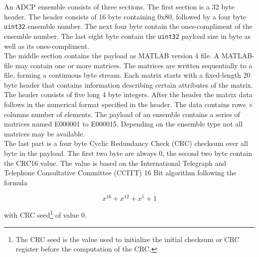 An ADCP ensemble consists of three sections. The first section is a 32 byte header. The header consists of 16 byte containing 0x80, followed by a four byte \texttt{uint32} ensemble number. The next four byte contain the ones-compliment of the ensemble number. The last eight byte contain the \texttt{uint32} payload size in byte as well as its ones-compliment.\\
The middle section contains the payload as MATLAB version 4 file. A MATLAB-file may contain one or more matrices. The matrices are written sequentially to a file,  forming a continuous byte stream. Each matrix starts with a fixed-length 20 byte header that contains information describing certain attributes of the matrix. The header consists of five long 4 byte integers. After the header the matrix data follows in the numerical format specified in the header. The data contains rows $\times$ columns number of elements.
The payload of an ensemble contains a series of matrices named E000001 to E000015. Depending on the ensemble type not all matrices may be available.\\
The last part is a four byte Cyclic Redundancy Check (CRC) checksum over all byte in the payload. The first two byte are always 0, the second two byte contain the CRC16 value. The value is based on the International Telegraph and Telephone Consultative Committee (CCITT) 16 Bit algorithm following the formula 

$$ x^{16} + x^{12} + x^5 +1$$

with CRC seed\footnote{\label{foot:3} The CRC seed is the value used to initialize the initial checksum or CRC register before the computation of the CRC.} of value 0.


